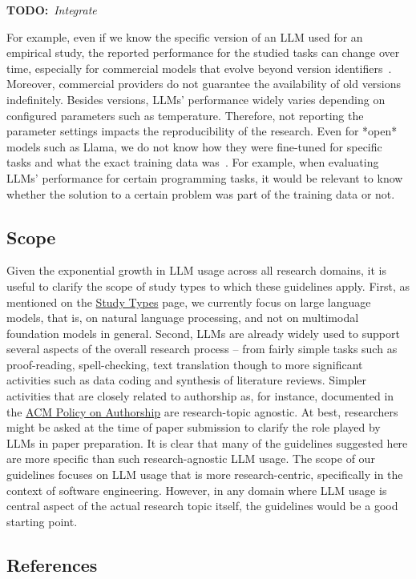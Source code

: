 \documentclass[11pt]{article}
\newcommand{\todo}[1]{{\textbf{TODO:}\ \textit{#1}}} %
\begin{document}
\todo{Integrate~\cite{DBLP:journals/corr/abs-2412-17859}}

For example, even if we know the specific version of an LLM used for an empirical study, the reported performance for the studied tasks can change over time, especially for commercial models that evolve beyond version identifiers~\cite{DBLP:journals/corr/abs-2307-09009}.
Moreover, commercial providers do not guarantee the availability of old versions indefinitely.
Besides versions, LLMs' performance widely varies depending on configured parameters such as temperature.
Therefore, not reporting the parameter settings impacts the reproducibility of the research.
Even for *open* models such as Llama, we do not know how they were fine-tuned for specific tasks and what the exact training data was~\cite{Gibney2024}.
For example, when evaluating LLMs' performance for certain programming tasks, it would be relevant to know whether the solution to a certain problem was part of the training data or not.


\subsection{Scope}

Given the exponential growth in LLM usage across all research domains, it is useful to clarify the scope of study types to which these guidelines apply.
First, as mentioned on the \href{/study-types/}{Study Types} page, we currently focus on large language models, that is, on natural language processing, and not on multimodal foundation models in general.
Second, LLMs are already widely used to support several aspects of the overall research process – from fairly simple tasks such as proof-reading, spell-checking, text translation though to more significant activities such as data coding and synthesis of literature reviews.
Simpler activities that are closely related to authorship as, for instance, documented in the \href{https://www.acm.org/publications/policies/frequently-asked-questions}{ACM Policy on Authorship} are research-topic agnostic.
At best, researchers might be asked at the time of paper submission to clarify the role played by LLMs in paper preparation.
It is clear that many of the guidelines suggested here are more specific than such research-agnostic LLM usage.
The scope of our guidelines focuses on LLM usage that is more research-centric, specifically in the context of software engineering.
However, in any domain where LLM usage is central aspect of the actual research topic itself, the guidelines would be a good starting point.


\subsection{References}



\end{document}
